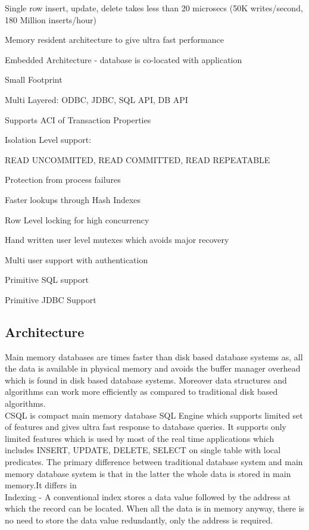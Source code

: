 \documentclass[12pt]{article}
\begin{document}
Single row insert, update, delete takes less than 20 microsecs (50K writes/second, 180 Million inserts/hour)

Memory resident architecture to give ultra fast performance

Embedded Architecture - database is co-located with application

Small Footprint

Multi Layered: ODBC, JDBC, SQL API, DB API

Supports ACI of Transaction Properties

Isolation Level support:

    READ UNCOMMITED, READ COMMITTED, READ REPEATABLE 

Protection from process failures

Faster lookups through Hash Indexes

Row Level locking for high concurrency

Hand written user level mutexes which avoids major recovery

Multi user support with authentication

Primitive SQL support

Primitive JDBC Support


\subsection{Architecture}
\label{arch}
Main memory databases are times faster than disk based database systems as, all the data is available 
in physical memory and avoids the buffer manager overhead which is found in disk based database systems. 
Moreover data structures and algorithms can work more efficiently as compared to traditional disk based algorithms. \\

CSQL is compact main memory database SQL Engine which supports limited set of features and gives ultra 
fast response to database queries. It supports only limited features which is used by most of the real time 
applications which includes INSERT, UPDATE, DELETE, SELECT on single table with local predicates.
The primary difference between traditional database system and main memory database system is that in the 
latter the whole data is stored in main memory.It differs in \\

    Indexing - A conventional index stores a data value followed by the address at which the record can be 
               located. When all the data is in memory anyway, there is no need to store the data value 
               redundantly, only the address is required. \\
\end{document}
